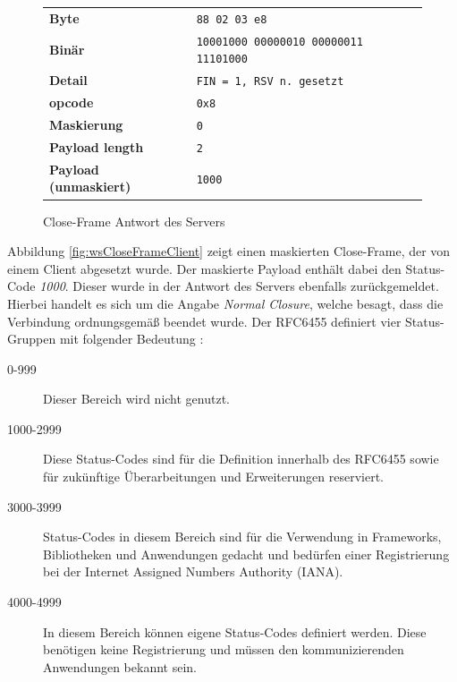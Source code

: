 \documentclass[11pt,a4paper,titlepage]{scrartcl}
\numberwithin{equation}{section}
\begin{document}
\begin{figure}[ht]
	\begin{center}
		\begin{tabular}{l>{\arraybackslash}p{8.0cm}}
			\textbf{Byte} & \texttt{88 02 03 e8} \\
			\textbf{Binär} & \texttt{10001000 00000010 00000011 11101000}\\
			\textbf{Detail} & \texttt{FIN = 1, RSV n. gesetzt} \\
			\textbf{opcode} & \texttt{0x8} \\ 
			\textbf{Maskierung} & \texttt{0}\\ 
			\textbf{Payload length} & \texttt{2}\\ 
			\textbf{Payload (unmaskiert)} & \texttt{1000} \\
		\end{tabular}
	\end{center}
	\caption{Close-Frame Antwort des Servers}
	\label{fig:wsCloseFrameServer}
\end{figure}

\noindent Abbildung \ref{fig:wsCloseFrameClient} zeigt einen maskierten Close-Frame, der von einem Client abgesetzt wurde. Der maskierte Payload enthält dabei den Status-Code \textit{1000}. Dieser wurde in der Antwort des Servers ebenfalls zurückgemeldet. Hierbei handelt es sich um die Angabe \textit{Normal Closure}, welche besagt, dass die Verbindung ordnungsgemäß beendet wurde. Der RFC6455 definiert vier Status-Gruppen mit folgender Bedeutung \autocite[46]{fette_websocket_2011}:
\begin{description}
	\item[0-999] Dieser Bereich wird nicht genutzt.
	\item[1000-2999] Diese Status-Codes sind für die Definition innerhalb des RFC6455 sowie für zukünftige Überarbeitungen und Erweiterungen reserviert.
	\item[3000-3999] Status-Codes in diesem Bereich sind für die Verwendung in Frameworks, Bibliotheken und Anwendungen gedacht und bedürfen einer Registrierung bei der Internet Assigned Numbers Authority (IANA).
	\item[4000-4999] In diesem Bereich können eigene Status-Codes definiert werden. Diese benötigen keine Registrierung und müssen den kommunizierenden Anwendungen bekannt sein. 
\end{description}
\end{document}
